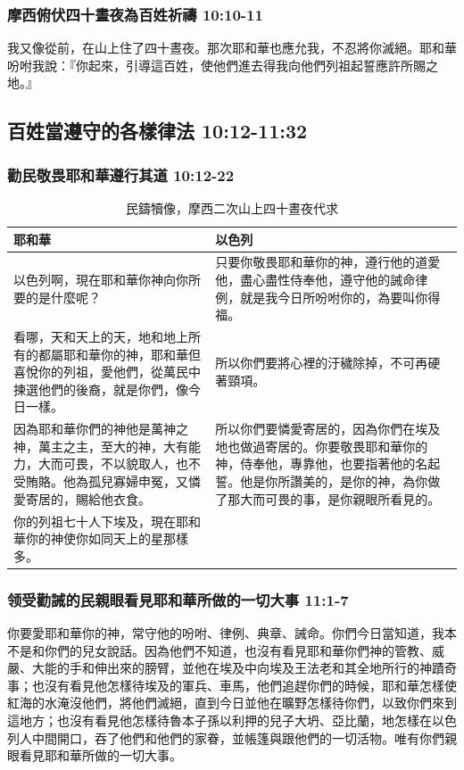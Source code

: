 \subsubsection{摩西俯伏四十晝夜為百姓祈禱 10:10-11}
我又像從前，在山上住了四十晝夜。那次耶和華也應允我，不忍將你滅絕。耶和華吩咐我說：『你起來，引導這百姓，使他們進去得我向他們列祖起誓應許所賜之地。』

\subsection{百姓當遵守的各樣律法 10:12-11:32}
\subsubsection{勸民敬畏耶和華遵行其道 10:12-22}
\begin{table}[H]
\begin{center}
\begin{tabular}{ p{7.5cm}|p{9.5cm} } \toprule
 耶和華&以色列 \\\hline
以色列啊，現在耶和華你神向你所要的是什麼呢？&
只要你敬畏耶和華你的神，遵行他的道愛他，盡心盡性侍奉他，遵守他的誡命律例，就是我今日所吩咐你的，為要叫你得福。\\\hline
看哪，天和天上的天，地和地上所有的都屬耶和華你的神，耶和華但喜悅你的列祖，愛他們，從萬民中揀選他們的後裔，就是你們，像今日一樣。&所以你們要將心裡的汙穢除掉，不可再硬著頸項。\\\hline
因為耶和華你們的神他是萬神之神，萬主之主，至大的神，大有能力，大而可畏，不以貌取人，也不受賄賂。他為孤兒寡婦申冤，又憐愛寄居的，賜給他衣食。&所以你們要憐愛寄居的，因為你們在埃及地也做過寄居的。你要敬畏耶和華你的神，侍奉他，專靠他，也要指著他的名起誓。他是你所讚美的，是你的神，為你做了那大而可畏的事，是你親眼所看見的。\\\hline
你的列祖七十人下埃及，現在耶和華你的神使你如同天上的星那樣多。&\\ \hline
\end{tabular}
\end{center}
\caption{民鑄犢像，摩西二次山上四十晝夜代求}
\end{table}


\subsubsection{领受勸誡的民親眼看見耶和華所做的一切大事 11:1-7}
你要愛耶和華你的神，常守他的吩咐、律例、典章、誡命。你們今日當知道，我本不是和你們的兒女說話。因為他們不知道，也沒有看見耶和華你們神的管教、威嚴、大能的手和伸出來的膀臂，並他在埃及中向埃及王法老和其全地所行的神蹟奇事；也沒有看見他怎樣待埃及的軍兵、車馬，他們追趕你們的時候，耶和華怎樣使紅海的水淹沒他們，將他們滅絕，直到今日並他在曠野怎樣待你們，以致你們來到這地方；也沒有看見他怎樣待魯本子孫以利押的兒子大坍、亞比蘭，地怎樣在以色列人中間開口，吞了他們和他們的家眷，並帳篷與跟他們的一切活物。唯有你們親眼看見耶和華所做的一切大事。

